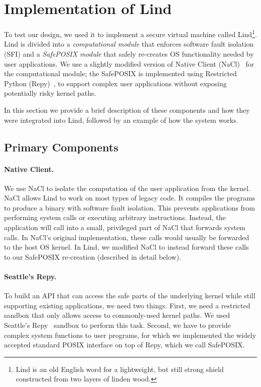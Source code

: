 \section{Implementation of Lind}
\label{sec.implementation}

To test our \lip design, we used it to implement a secure virtual machine
called Lind\footnote{\scriptsize Lind is an old English word for a lightweight, but still strong shield
constructed from two layers of linden wood.}.  Lind is divided into a
\emph{computational module} that enforces software fault isolation (SFI) and a
\emph{SafePOSIX module} that safely re-creates OS functionality needed by user
applications.  We use a slightly modified version of Native Client
(NaCl)~\cite{NaCl-09} for the computational module; the SafePOSIX is
implemented using Restricted Python (Repy)~\cite{Repy-10}, to support
complex user applications without exposing potentially risky kernel paths.

In this section we provide a brief description of these components and how they
were integrated into Lind, followed by an example of how the system works.

\subsection{Primary Components}

\paragraph{Native Client.}
We use NaCl to isolate the computation of the user application
from the kernel. NaCl allows Lind to work on most types of legacy code.
It compiles the programs to produce a binary with software fault isolation.
This prevents applications from performing system calls
or executing arbitrary instructions.
Instead, the application will call into a small, privileged
part of NaCl that forwards system calls. In NaCl's original implementation,
these calls would usually be forwarded to the host OS kernel. In Lind, we
modified NaCl to instead forward these calls to our SafePOSIX re-creation 
(described in detail below).

\paragraph{Seattle's Repy.}

To build an API that can access the safe parts of the underlying kernel while
still supporting existing applications, we need two things. First, we need a
restricted sandbox that only allows access to commonly-used kernel paths. We
used Seattle's Repy~\cite{Repy-10} sandbox to perform this task. Second, we
have to provide complex system functions to user programs,
for which we implemented the widely accepted standard POSIX interface on top of Repy, 
which we call SafePOSIX. 

